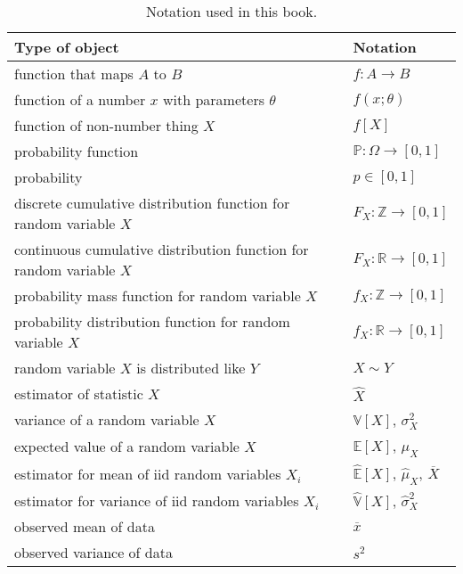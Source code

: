\begin{table}
\centering
\begin{tabular}{ll}
\toprule
Type of object & Notation \\
\midrule
function that maps $A$ to $B$ & $f : A \to B$ \\
function of a number $x$ with parameters $\theta$ & $f(x; \theta)$ \\
function of non-number thing $X$ & $f[X]$ \\
probability function & $\mathbb{P} : \Omega \to [0, 1]$ \\
probability & $p \in [0, 1]$ \\
discrete cumulative distribution function for random variable $X$ & $F_X : \mathbb{Z} \to [0, 1]$ \\
continuous cumulative distribution function for random variable $X$ & $F_X : \mathbb{R} \to [0, 1]$ \\
probability mass function for random variable $X$ & $f_X : \mathbb{Z} \to [0, 1]$ \\
probability distribution function for random variable $X$ & $f_X : \mathbb{R} \to [0, 1]$ \\
random variable $X$ is distributed like $Y$ & $X \sim Y$ \\
estimator of statistic $X$ & $\hat{X}$ \\
variance of a random variable $X$ & $\mathbb{V}[X]$, $\sigma_{X}^2$ \\
expected value of a random variable $X$ & $\mathbb{E}[X]$, $\mu_X$ \\
estimator for mean of iid random variables $X_i$ & $\hat{\mathbb{E}}[X]$, $\hat{\mu}_X$, $\overline{X}$ \\
estimator for variance of iid random variables $X_i$ & $\hat{\mathbb{V}}[X]$, $\hat{\sigma}_X^2$ \\
observed mean of data & $\overline{x}$ \\
observed variance of data & $s^2$ \\
\bottomrule
\end{tabular}
\caption{Notation used in this book.}
\label{tab:notation}
\end{table}
